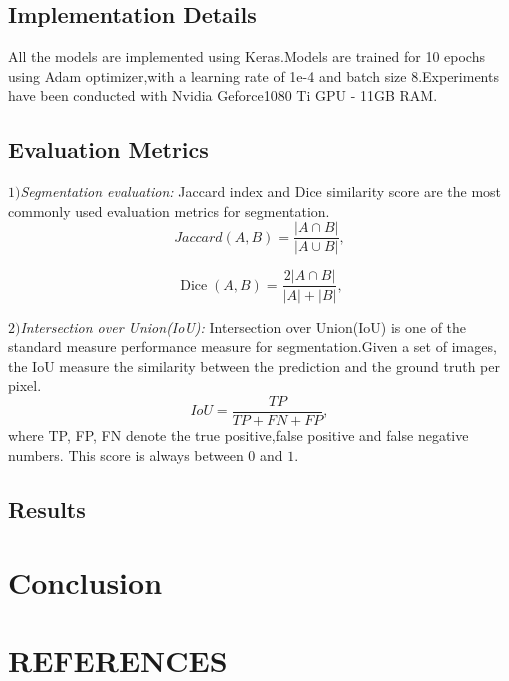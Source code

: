 \documentclass{article}
\begin{document}
\subsection{Implementation Details}
All the models are implemented using Keras.Models are trained for 10 epochs using Adam optimizer,with a learning rate of 1e-4 and batch size 8.Experiments have been conducted with Nvidia Geforce1080 Ti GPU - 11GB RAM.
\subsection{Evaluation Metrics}
\(1)\){\it Segmentation  evaluation: }Jaccard index and Dice similarity score are the most commonly used evaluation metrics for segmentation.
\begin{equation}
J a c c a r d(A, B)=\frac{|A \cap B|}{|A \cup B|},
\end{equation}

\begin{equation}
\operatorname{Dice}(A, B)=\frac{2|A \cap B|}{|A|+|B|},
\end{equation}

\(2)\){\it Intersection over Union(IoU): } Intersection over Union(IoU) is one of the standard measure performance measure for segmentation.Given a set of images, the IoU measure the similarity between the prediction and the ground truth per pixel.
\begin{equation}
IoU=\frac{TP}{TP+FN+FP},
\end{equation}
where TP, FP, FN denote the true positive,false positive and false negative numbers. This score is always between $0$ and $1$.
\subsection{Results}

\section{Conclusion}
\label{sec:con}


\vfill\pagebreak

\section{REFERENCES}
\label{sec:refs}
\end{document}
